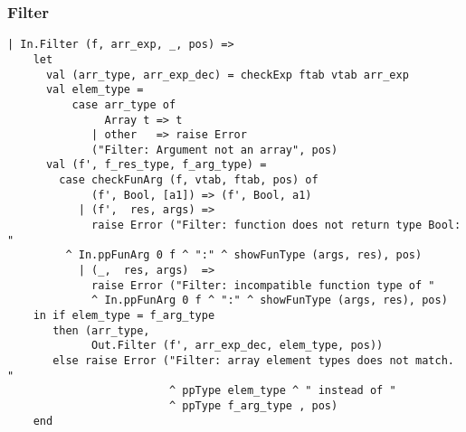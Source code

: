 \documentclass[12pt]{article}
\begin{document}
\subsubsection{Filter}

\begin{verbatim}
| In.Filter (f, arr_exp, _, pos) => 
    let 
      val (arr_type, arr_exp_dec) = checkExp ftab vtab arr_exp
      val elem_type =
          case arr_type of
               Array t => t
             | other   => raise Error 
             ("Filter: Argument not an array", pos)
      val (f', f_res_type, f_arg_type) =
        case checkFunArg (f, vtab, ftab, pos) of
             (f', Bool, [a1]) => (f', Bool, a1)
           | (f',  res, args) =>
             raise Error ("Filter: function does not return type Bool: " 
         ^ In.ppFunArg 0 f ^ ":" ^ showFunType (args, res), pos)
           | (_,  res, args)  =>
             raise Error ("Filter: incompatible function type of "
             ^ In.ppFunArg 0 f ^ ":" ^ showFunType (args, res), pos)
    in if elem_type = f_arg_type
       then (arr_type,
             Out.Filter (f', arr_exp_dec, elem_type, pos))
       else raise Error ("Filter: array element types does not match. "
                         ^ ppType elem_type ^ " instead of "
                         ^ ppType f_arg_type , pos)
    end
\end{verbatim}
\end{document}
